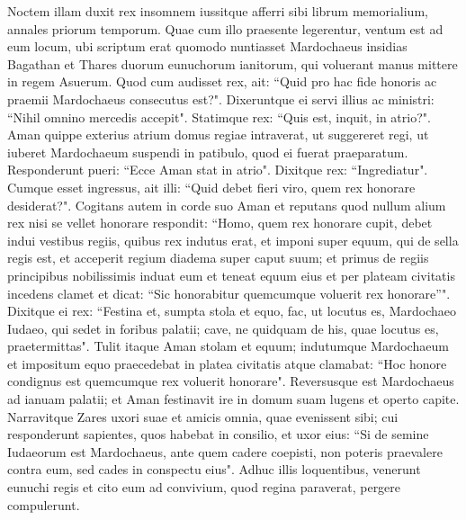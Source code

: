 \begin{biblechapter} 
\verse Noctem illam duxit rex insomnem iussitque afferri sibi librum memorialium, annales priorum temporum. Quae cum illo praesente legerentur, 
\verse ventum est ad eum locum, ubi scriptum erat quomodo nuntiasset Mardochaeus insidias Bagathan et Thares duorum eunuchorum ianitorum, qui voluerant manus mittere in regem Asuerum. 
\verse Quod cum audisset rex, ait: “Quid pro hac fide honoris ac praemii Mardochaeus consecutus est?". Dixeruntque ei servi illius ac ministri: “Nihil omnino mercedis accepit". 
\verse Statimque rex: “Quis est, inquit, in atrio?". Aman quippe exterius atrium domus regiae intraverat, ut suggereret regi, ut iuberet Mardochaeum suspendi in patibulo, quod ei fuerat praeparatum. 
\verse Responderunt pueri: “Ecce Aman stat in atrio". Dixitque rex: “Ingrediatur". 
\verse Cumque esset ingressus, ait illi: “Quid debet fieri viro, quem rex honorare desiderat?". Cogitans autem in corde suo Aman et reputans quod nullum alium rex nisi se vellet honorare 
\verse respondit: “Homo, quem rex honorare cupit, 
\verse debet indui vestibus regiis, quibus rex indutus erat, et imponi super equum, qui de sella regis est, et acceperit regium diadema super caput suum; 
\verse et primus de regiis principibus nobilissimis induat eum et teneat equum eius et per plateam civitatis incedens clamet et dicat: “Sic honorabitur quemcumque voluerit rex honorare”". 
\verse Dixitque ei rex: “Festina et, sumpta stola et equo, fac, ut locutus es, Mardochaeo Iudaeo, qui sedet in foribus palatii; cave, ne quidquam de his, quae locutus es, praetermittas". 
\verse Tulit itaque Aman stolam et equum; indutumque Mardochaeum et impositum equo praecedebat in platea civitatis atque clamabat: “Hoc honore condignus est quemcumque rex voluerit honorare". 
\verse Reversusque est Mardochaeus ad ianuam palatii; et Aman festinavit ire in domum suam lugens et operto capite. 
\verse Narravitque Zares uxori suae et amicis omnia, quae evenissent sibi; cui responderunt sapientes, quos habebat in consilio, et uxor eius: “Si de semine Iudaeorum est Mardochaeus, ante quem cadere coepisti, non poteris praevalere contra eum, sed cades in conspectu eius". 
\verse Adhuc illis loquentibus, venerunt eunuchi regis et cito eum ad convivium, quod regina paraverat, pergere compulerunt. 
\end{biblechapter}

